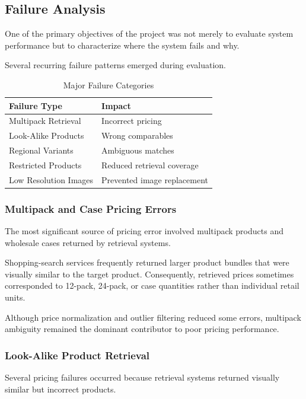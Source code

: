 \documentclass[conference]{IEEEtran}
\begin{document}
\subsection{Failure Analysis}

One of the primary objectives of the project was not merely to evaluate system
performance but to characterize where the system fails and why.

Several recurring failure patterns emerged during evaluation.
\begin{table}[t]
\caption{Major Failure Categories}
\label{tab:failures}
\centering
\begin{tabular}{ll}
\toprule
Failure Type & Impact \\
\midrule
Multipack Retrieval & Incorrect pricing \\
Look-Alike Products & Wrong comparables \\
Regional Variants & Ambiguous matches \\
Restricted Products & Reduced retrieval coverage \\
Low Resolution Images & Prevented image replacement \\
\bottomrule
\end{tabular}
\end{table}

\subsubsection{Multipack and Case Pricing Errors}

The most significant source of pricing error involved multipack products and
wholesale cases returned by retrieval systems.

Shopping-search services frequently returned larger product bundles that were
visually similar to the target product.
Consequently, retrieved prices sometimes corresponded to 12-pack,
24-pack, or case quantities rather than individual retail units. 

Although price normalization and outlier filtering reduced some errors,
multipack ambiguity remained the dominant contributor to poor pricing
performance.

\subsubsection{Look-Alike Product Retrieval}

Several pricing failures occurred because retrieval systems returned visually
similar but incorrect products.
\end{document}
